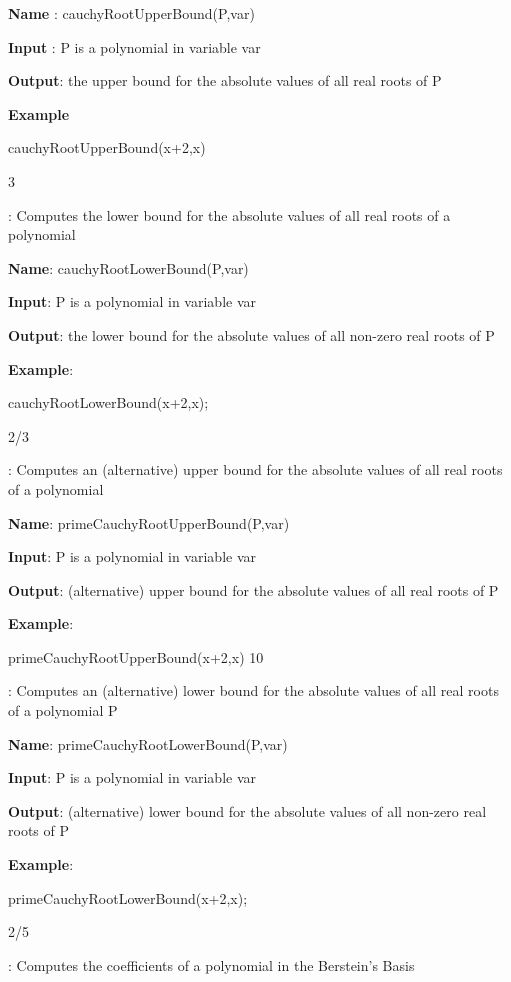 \documentclass{article}
\begin{document}
{\bf Name} : cauchyRootUpperBound(P,var)
  
{\bf Input} : P is a polynomial in variable var
  
{\bf Output}: the upper bound for the absolute values of all real roots of P
  
{\bf Example}

cauchyRootUpperBound(x+2,x)

    3

  
  
:
  Computes the lower bound for the absolute values of all real roots of a
  polynomial
  
{\bf Name}: cauchyRootLowerBound(P,var)
  
{\bf  Input}: P is a polynomial in variable var
  
{\bf   Output}: the lower bound for the absolute values of all non-zero real roots
  of P
  
{\bf Example}:

cauchyRootLowerBound(x+2,x);

2/3

:
  Computes an (alternative) upper bound for the absolute values of all real
  roots of a polynomial
  
{\bf Name}: primeCauchyRootUpperBound(P,var)
  
{\bf Input}: P is a polynomial in variable var
  
{\bf Output}: (alternative) upper bound for the absolute values of all real roots
  of P
  
{\bf Example}:
  
  primeCauchyRootUpperBound(x+2,x)
  10


:
  Computes an (alternative) lower bound for the absolute values of all real
  roots of a polynomial P
  
{\bf Name}: primeCauchyRootLowerBound(P,var)
  
 {\bf  Input}: P is a polynomial in variable var
  
 {\bf  Output}: (alternative) lower bound for the absolute values of all non-zero
  real roots of P
  
{\bf Example}:

primeCauchyRootLowerBound(x+2,x);

2/5

  

:
  Computes the coefficients of a polynomial in the Berstein's Basis
  
\end{document}
